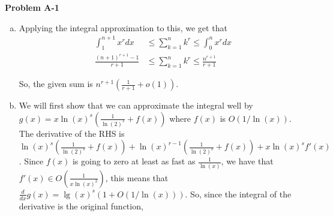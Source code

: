 \documentclass{article}
\begin{document}
 \noindent\textbf{Problem A-1}\\
\begin{enumerate}[a.]
\item
Applying the integral approximation to this, we get that
\begin{align*}
\int_{1}^{n+1} x^r dx &\le \sum_{k=1}^n k^r \le \int_0^{n} x^r dx\\
\frac{(n+1)^{r+1} -1}{r+1} &\le \sum_{k=1}^n k^r \le \frac{n^{r+1}}{r+1}
\end{align*}

So, the given sum is $n^{r+1}(\frac{1}{r+1} + o(1))$.

\item
\begin{comment}
We'll throw out the first term since in the integral approximation we'd be trying to evaluate the summand at 0 if we left the first term 1. This omission won't affect the sum at all because $\lg(1) = 0$.

We'll first try to bound the sum from below.
\[
\sum_{k=2}^n (\lg(k))^s  \ge \sum_{k=2}^n \frac{(\lg(k))^s}{k} \ge \int_{2}^{n+1} \frac{(\lg(x))^s}{x} dx  \in \Omega(lg(n)^{s+1})
\]
where the integral is valuated by a u-substitution with $u=\lg(x)$.

Now, we try to bound the sum from above.
\[
\sum_{k=2}^n (\lg(k))^s \le 
\]
\end{comment}
\begin{comment}
We'll split up the domain into $\lg(n)$ pieces. based on being between $1/2^i$ and $1/2^{i+1}$. This gets us
\begin{align*}
\sum_{k=1}^{k=n} &\ge(k)^s \ge \sum_{k=1}^{\lfloor \lg(n) \rfloor} \sum_{i=1}^{2^k} (\lg(2^{k} +i))^s 
&\ge \sum_{k=1}^{\lfloor \lg(n) \rfloor}  \sum_{i=1}^{2^k} (\lg(2^{k+1}))^s
& = \sum_{k=1}^{\lfloor \lg(n) \rfloor} 2^k (k+1)^s
\end{align*}
\end{comment}

We will first show that  we can approximate the integral well by $g(x) = x \ln(x)^s( \frac{1}{\ln(2)^s}+ f(x))$ where $f(x)$ is $O(1/\ln(x))$. The derivative of the RHS is $\ln(x)^s( \frac{1}{\ln(2)^s}+ f(x)) + \ln(x)^{r-1}( \frac{1}{\ln(2)^s}+ f(x)) +  x \ln(x)^s f'(x)$. Since $f(x)$ is going to zero at least as fast as $\frac{1}{\ln(x)}$, we have that $f'(x) \in O(\frac{1}{x\ln(x)^2})$, this means that $\frac{d}{dx} g(x) = \lg(x)^s ( 1+ O(1/\ln(x)))$. So, since the integral of the derivative is the original function, 


\end{enumerate}
\end{document}
